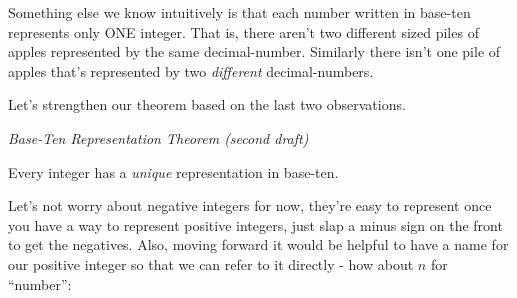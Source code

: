 \documentclass{article}
\newenvironment{jprIn}{\begin{adjustwidth}{2em}{}}{\end{adjustwidth}}
\begin{document}
Something else we know intuitively is that each number written
in base-ten represents only ONE integer. That is, there aren't two different
sized piles of apples represented by the same decimal-number. Similarly there
isn't one pile of apples that's represented by two \emph{different} decimal-numbers.

% 

Let's strengthen our theorem based on the last two observations.

\emph{Base-Ten Representation Theorem (second draft)}
\begin{jprIn}
Every integer has a \emph{unique} representation in base-ten.
\end{jprIn}


Let's not worry about negative integers for now,
they're easy to represent once you have a way to represent
positive integers, just slap a minus sign on the front to get the negatives.
Also, moving forward it would be helpful to have a name for our 
positive integer so that we can refer to it directly - how about $n$ for ``number'':
\end{document}
